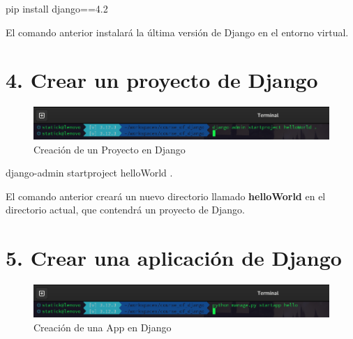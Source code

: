 \documentclass[
  a4paper,
  DIV=11,
  numbers=noendperiod,
  onepage,
  openany]{scrreprt}
\newenvironment{Shaded}{\begin{snugshade}}{\end{snugshade}}
\newcommand{\ExtensionTok}[1]{\textcolor[rgb]{0.00,0.23,0.31}{#1}}
\newcommand{\NormalTok}[1]{\textcolor[rgb]{0.00,0.23,0.31}{#1}}
\begin{document}
\begin{Shaded}
\begin{Highlighting}[]
\ExtensionTok{pip}\NormalTok{ install django==4.2}
\end{Highlighting}
\end{Shaded}

El comando anterior instalará la última versión de Django en el entorno
virtual.

\section{4. Crear un proyecto de
Django}\label{crear-un-proyecto-de-django}

\begin{figure}[H]

{\centering \includegraphics{images/creacion_project_django.png}

}

\caption{Creación de un Proyecto en Django}

\end{figure}%

\begin{Shaded}
\begin{Highlighting}[]
\ExtensionTok{django{-}admin}\NormalTok{ startproject helloWorld .}
\end{Highlighting}
\end{Shaded}

El comando anterior creará un nuevo directorio llamado
\textbf{helloWorld} en el directorio actual, que contendrá un proyecto
de Django.

\section{5. Crear una aplicación de
Django}\label{crear-una-aplicaciuxf3n-de-django}

\begin{figure}[H]

{\centering \includegraphics{images/creacion_app_django.png}

}

\caption{Creación de una App en Django}

\end{figure}%
\end{document}
